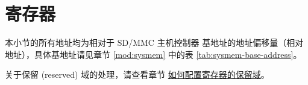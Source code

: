 \documentclass[main\_\_CN.tex]{subfiles}
\begin{document}





\newpage
\section{寄存器}
\label{sec:sdhost-reg}

本小节的所有地址均为相对于 SD/MMC 主机控制器 基地址的地址偏移量（相对地址），具体基地址请见章节 \ref{mod:sysmem} \textit{} 中的表 \ref{tab:sysmem-base-address}。

关于保留 (reserved) 域的处理，请查看章节 \hyperref[programming-reserved-field]{如何配置寄存器的保留域}。


\end{document}
